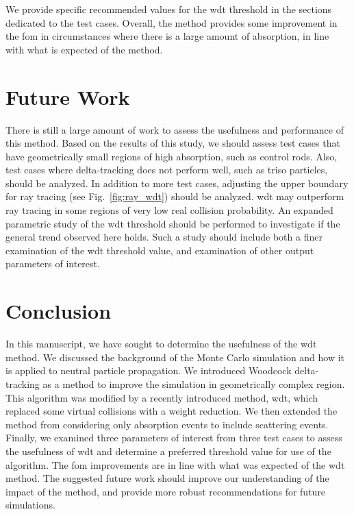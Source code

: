 We provide specific recommended values for the \gls{wdt} threshold in
the sections dedicated to the test cases. Overall, the method provides
some improvement in the \gls{fom} in circumstances where there is a
large amount of absorption, in line with what is expected of the method.

\section{Future Work}
\label{sec:future_work}

There is still a large amount of work to assess the usefulness and
performance of this method. Based on the results of this study, we
should assess test cases that have geometrically small regions of high
absorption, such as control rods. Also, test cases where
delta-tracking does not perform well, such as \gls{triso} particles,
should be analyzed. In addition to more test cases, adjusting the
upper boundary for ray tracing (see Fig.~\ref{fig:ray_wdt}) should be
analyzed. \Gls{wdt} may outperform ray tracing in some regions of very
low real collision probability. An expanded parametric study of
the \gls{wdt} threshold should be performed to investigate if the general
trend observed here holds. Such a study should include both a finer
examination of the \gls{wdt} threshold value, and examination of other
output parameters of interest.

\section{Conclusion}
\label{sec:conclusion}

In this manuscript, we have sought to determine the usefulness of the
\gls{wdt} method. We discussed the background of the Monte Carlo
simulation and how it is applied to neutral particle propagation. We
introduced Woodcock delta-tracking as a method to improve the
simulation in geometrically complex region. This algorithm was
modified by a recently introduced method, \acrlong{wdt}, which
replaced some virtual collisions with a weight reduction. We then
extended the method from considering only absorption events to include
scattering events. Finally, we examined three parameters of interest
from three test cases to assess the usefulness of \gls{wdt} and
determine a preferred threshold value for use of the algorithm. The
\gls{fom} improvements are in line with what was expected of the
\gls{wdt} method. The suggested future work should improve our
understanding of the impact of the method, and provide more robust
recommendations for future simulations.


